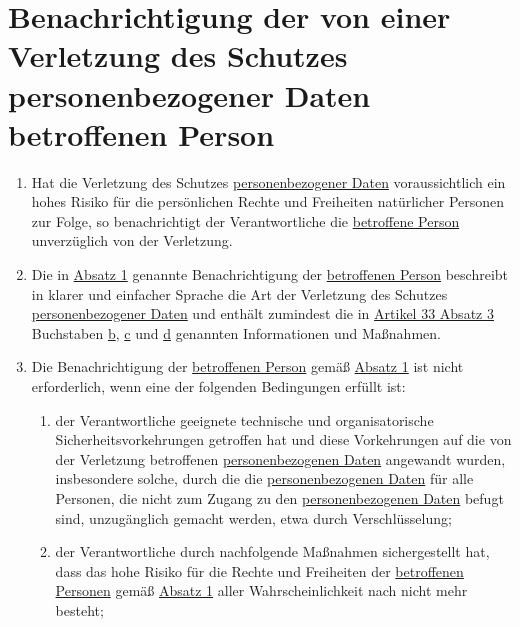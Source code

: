 \chapter{Benachrichtigung der von einer Verletzung des Schutzes personenbezogener Daten betroffenen Person}
\label{ch:34}


\begin{enumerate}

  \item Hat die Verletzung des Schutzes \hyperref[itm:04-1]{personenbezogener Daten} voraussichtlich ein hohes Risiko für die persönlichen
   Rechte und Freiheiten natürlicher Personen zur Folge, so benachrichtigt der Verantwortliche die \hyperref[itm:04-1]{betroffene Person}
   unverzüglich von der Verletzung.
  \label{itm:34-1}

  \item Die in \hyperref[itm:34-1]{Absatz 1} genannte Benachrichtigung der \hyperref[itm:04-1]{betroffenen Person} beschreibt in klarer und
   einfacher Sprache die Art der Verletzung des Schutzes \hyperref[itm:04-1]{personenbezogener Daten} und enthält zumindest die in
   \hyperref[itm:33-3]{Artikel 33 Absatz 3} Buchstaben \hyperref[itm:33-3b]{b}, \hyperref[itm:33-3c]{c} und \hyperref
    [itm:33-3d]{d} genannten Informationen und Maßnahmen.
  \label{itm:34-2}

  \item Die Benachrichtigung der \hyperref[itm:04-1]{betroffenen Person} gemäß \hyperref[itm:34-1]{Absatz 1} ist nicht erforderlich, wenn eine der folgenden
   Bedingungen erfüllt ist:
  \label{itm:34-3}

  \begin{enumerate}
  
    \item der Verantwortliche geeignete technische und organisatorische Sicherheitsvorkehrungen getroffen hat und diese
     Vorkehrungen auf die von der Verletzung betroffenen \hyperref[itm:04-1]{personenbezogenen Daten} angewandt wurden, insbesondere solche,
     durch die die \hyperref[itm:04-1]{personenbezogenen Daten} für alle Personen, die nicht zum Zugang zu den \hyperref[itm:04-1]{personenbezogenen Daten}
     befugt sind, unzugänglich gemacht werden, etwa durch Verschlüsselung;
    \label{itm:34-3a}

    \item der Verantwortliche durch nachfolgende Maßnahmen sichergestellt hat, dass das hohe Risiko für die Rechte und
     Freiheiten der \hyperref[itm:04-1]{betroffenen Personen} gemäß \hyperref[itm:34-1]{Absatz 1} aller Wahrscheinlichkeit nach nicht mehr
     besteht;
    \label{itm:34-3b}


\end{enumerate}
\end{enumerate}
